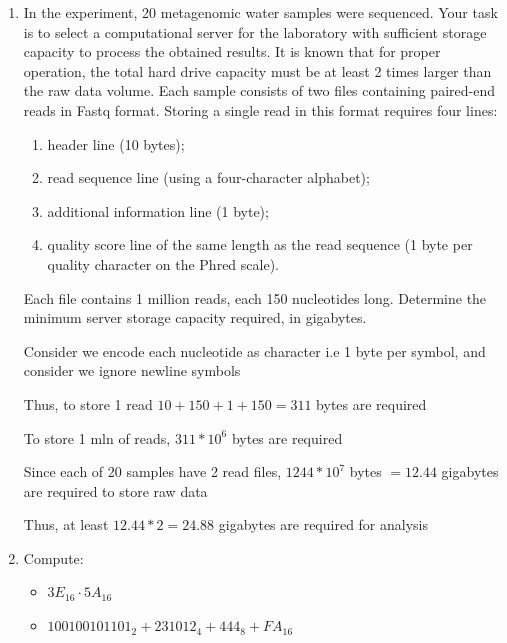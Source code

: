 \documentclass[12pt]{article}
\begin{document}
\begin{enumerate}
Consider encoding:

$A = 00_2 = 2 bits$

$T = 01_2 = 2 bits$

$C = 11_2 = 2 bits$

$G = 10_2 = 2 bits$

Then to store 1032 nucleotides, $1032 * 2 = 2064$ bits $= 258$ bytes required


\item In the experiment, 20 metagenomic water samples were sequenced. Your task is to select a computational server for the laboratory with sufficient storage capacity to process the obtained results. It is known that for proper operation, the total hard drive capacity must be at least 2 times larger than the raw data volume. Each sample consists of two files containing paired-end reads in Fastq format. Storing a single read in this format requires four lines:
\begin{enumerate}
    \item[(a)] header line (10 bytes);
    \item[(b)] read sequence line (using a four-character alphabet);
    \item[(c)] additional information line (1 byte);
    \item[(d)] quality score line of the same length as the read sequence (1 byte per quality character on the Phred scale).
\end{enumerate}
Each file contains 1 million reads, each 150 nucleotides long. Determine the minimum server storage capacity required, in gigabytes.

Consider we encode each nucleotide as character i.e 1 byte per symbol, and consider we ignore newline symbols

Thus, to store 1 read $10 + 150 + 1 + 150 = 311$ bytes are required

To store 1 mln of reads, $311 * 10^6$ bytes are required

Since each of 20 samples have 2 read files, $1244 * 10^7$ bytes $= 12.44$ gigabytes are required to store raw data

Thus, at least $12.44 * 2 = 24.88$ gigabytes are required for analysis


\item Compute:
\begin{itemize}
    \item \(3E_{16} \cdot 5A_{16}\)
    \item \(100100101101_{2} + 231012_{4} + 444_{8} + FA_{16}\)
\end{itemize}


\end{enumerate}
\end{document}
